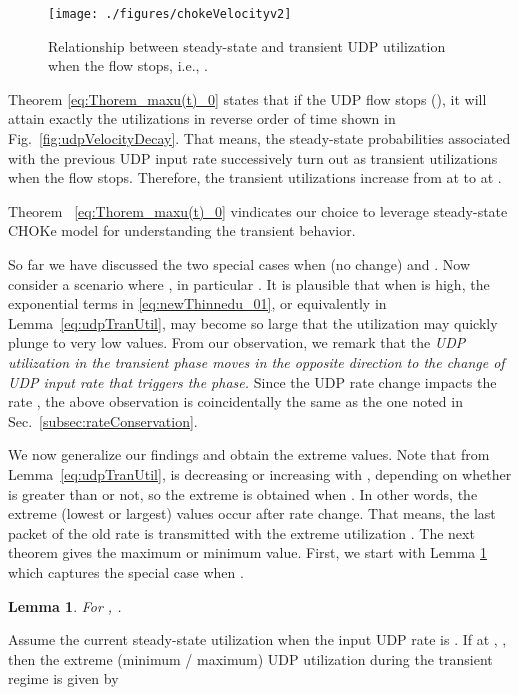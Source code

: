 \documentclass{IEEEtran}
\newtheorem{lemma}{Lemma}
\begin{document}
    \begin{figure}[h!]
            \centering
            \texttt{[image: ./figures/chokeVelocityv2]}\caption{Relationship between steady-state  and transient UDP utilization  when the flow stops, i.e., .}
            \label{fig:relation-rho0(y)-udpTran}
    \end{figure}

    Theorem \ref{eq:Thorem_maxu(t)_0} states that if the UDP flow stops (), it will attain exactly the utilizations  in reverse order of time shown in Fig.~\ref{fig:udpVelocityDecay}. That means, the steady-state probabilities  associated with the previous UDP input rate  successively turn out as transient utilizations when the flow stops. Therefore, the transient utilizations increase from  at  to  at .

    Theorem ~\ref{eq:Thorem_maxu(t)_0} vindicates our choice to leverage steady-state CHOKe model for understanding the transient behavior.

     So far we have discussed the two special cases when  (no change) and . Now consider a scenario where  , in particular . It is plausible that when  is high, the exponential terms in \eqref{eq:newThinnedu_01}, or equivalently in Lemma~\ref{eq:udpTranUtil}, may become so large that the utilization may quickly plunge to very low values. From our observation, we remark that the \emph{UDP utilization in the transient phase moves in the opposite direction to the change of UDP input rate that triggers the phase. } Since the UDP rate change impacts the rate , the above observation is coincidentally the same as the one noted in Sec.~\ref{subsec:rateConservation}.

     We now generalize our findings and obtain the extreme values. Note that from Lemma~\ref{eq:udpTranUtil},  is decreasing or increasing with , depending on whether  is greater than  or not, so the extreme is obtained when . In other words, the extreme (lowest or largest) values occur  after rate change. That means, the last packet of the old rate  is transmitted with the extreme utilization .  The next theorem gives the maximum or minimum value. First, we start with Lemma \ref{lemma:alpha1} which captures the special case when .

    \begin{lemma}\label{lemma:alpha1}
        For , .
    \end{lemma}

     \begin{theorem}\label{eq:Thorem_maxu(t)_0Alpha}
        Assume the current steady-state utilization  when the input UDP rate is . If  at , , then the extreme (minimum / maximum) UDP utilization during the transient regime is given by
        
    \end{theorem}
\end{document}
